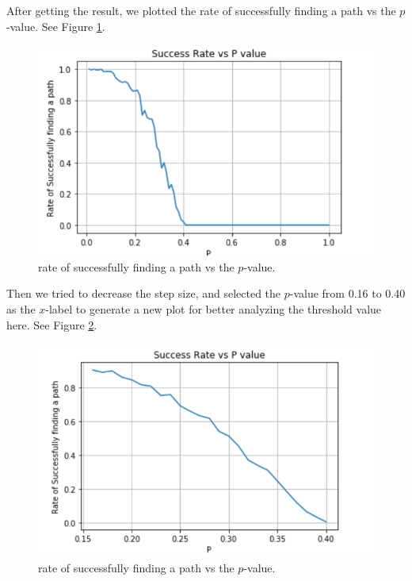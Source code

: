 \documentclass[letter]{article}
\begin{document}
\begin{questions}
	After getting the result, we plotted the rate of successfully finding a path vs the $ p $-value. See Figure \ref{fig:3-1}. \\
	
	\begin{figure}
		\centering
		\includegraphics[width=\textwidth]{../pics/question3-1.png}
		\caption{\label{fig:3-1}rate of successfully finding a path vs the $ p $-value.}
	\end{figure}
	
	Then we tried to decrease the step size, and selected the $ p $-value from 0.16 to 0.40 as the $ x $-label to generate a new plot for better analyzing the threshold value here. See Figure \ref{fig:3-2}.\\
	
	\begin{figure}
		\centering
		\includegraphics[width=\textwidth]{../pics/question3-2.png}
		\caption{\label{fig:3-2}rate of successfully finding a path vs the $ p $-value.}
	\end{figure}


\end{questions}
\end{document}
